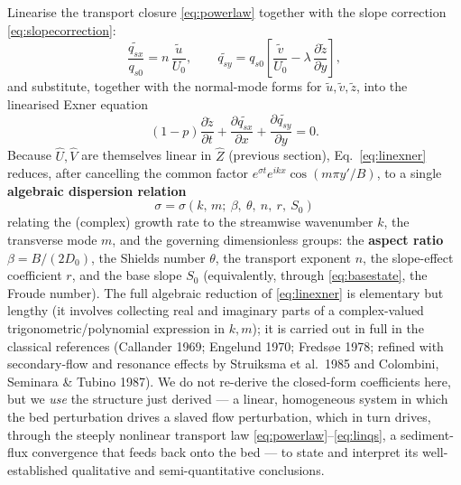 \documentclass[11pt,a4paper]{report}
\theoremstyle{definition}
\theoremstyle{plain}
\theoremstyle{remark}
\newcommand{\pdv}[2]{\dfrac{\partial #1}{\partial #2}}
\begin{document}
Linearise the transport closure \eqref{eq:powerlaw} together with the slope correction \eqref{eq:slopecorrection}:
\begin{equation}
\frac{\widetilde{q_{sx}}}{q_{s0}} = n\,\frac{\tilde u}{U_0}, \qquad
\widetilde{q_{sy}} = q_{s0}\left[\frac{\tilde v}{U_0} - \lambda\,\pdv{\tilde z}{y}\right],
\label{eq:linqs}
\end{equation}
and substitute, together with the normal-mode forms for $\tilde u,\tilde v,\tilde z$, into the linearised Exner equation
\begin{equation}
(1-p)\pdv{\tilde z}{t} + \pdv{\widetilde{q_{sx}}}{x} + \pdv{\widetilde{q_{sy}}}{y} = 0.
\label{eq:linexner}
\end{equation}
Because $\widehat U,\widehat V$ are themselves linear in $\widehat Z$ (previous section), Eq.~\eqref{eq:linexner} reduces, after cancelling the common factor $e^{\sigma t}e^{ikx}\cos(m\pi y'/B)$, to a single \textbf{algebraic dispersion relation}
\begin{equation}
\boxed{\ \sigma = \sigma(k,\,m;\ \beta,\ \theta,\ n,\ r,\ S_0)\ }
\label{eq:dispersion}
\end{equation}
relating the (complex) growth rate to the streamwise wavenumber $k$, the transverse mode $m$, and the governing dimensionless groups: the \textbf{aspect ratio} $\beta=B/(2D_0)$, the Shields number $\theta$, the transport exponent $n$, the slope-effect coefficient $r$, and the base slope $S_0$ (equivalently, through \eqref{eq:basestate}, the Froude number). The full algebraic reduction of \eqref{eq:linexner} is elementary but lengthy (it involves collecting real and imaginary parts of a complex-valued trigonometric/polynomial expression in $k,m$); it is carried out in full in the classical references (Callander 1969; Engelund 1970; Fredsøe 1978; refined with secondary-flow and resonance effects by Struiksma et al.\ 1985 and Colombini, Seminara \& Tubino 1987). We do not re-derive the closed-form coefficients here, but we \emph{use} the structure just derived --- a linear, homogeneous system in which the bed perturbation drives a slaved flow perturbation, which in turn drives, through the steeply nonlinear transport law \eqref{eq:powerlaw}--\eqref{eq:linqs}, a sediment-flux convergence that feeds back onto the bed --- to state and interpret its well-established qualitative and semi-quantitative conclusions.
\end{document}
